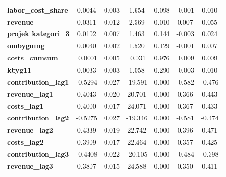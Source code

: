 \begin{center}
\begin{tabular}{lcccccc}
\textbf{labor\_cost\_share}                 &       0.0044  &        0.003     &     1.654  &         0.098        &       -0.001    &        0.010     \\
\textbf{revenue}                            &       0.0311  &        0.012     &     2.569  &         0.010        &        0.007    &        0.055     \\
\textbf{projektkategori\_3}                 &       0.0102  &        0.007     &     1.463  &         0.144        &       -0.003    &        0.024     \\
\textbf{ombygning}                          &       0.0030  &        0.002     &     1.520  &         0.129        &       -0.001    &        0.007     \\
\textbf{costs\_cumsum}                      &      -0.0001  &        0.005     &    -0.031  &         0.976        &       -0.009    &        0.009     \\
\textbf{kbyg11}                             &       0.0033  &        0.003     &     1.058  &         0.290        &       -0.003    &        0.010     \\
\textbf{contribution\_lag1}                 &      -0.5294  &        0.027     &   -19.591  &         0.000        &       -0.582    &       -0.476     \\
\textbf{revenue\_lag1}                      &       0.4043  &        0.020     &    20.701  &         0.000        &        0.366    &        0.443     \\
\textbf{costs\_lag1}                        &       0.4000  &        0.017     &    24.071  &         0.000        &        0.367    &        0.433     \\
\textbf{contribution\_lag2}                 &      -0.5275  &        0.027     &   -19.346  &         0.000        &       -0.581    &       -0.474     \\
\textbf{revenue\_lag2}                      &       0.4339  &        0.019     &    22.742  &         0.000        &        0.396    &        0.471     \\
\textbf{costs\_lag2}                        &       0.3909  &        0.017     &    22.464  &         0.000        &        0.357    &        0.425     \\
\textbf{contribution\_lag3}                 &      -0.4408  &        0.022     &   -20.105  &         0.000        &       -0.484    &       -0.398     \\
\textbf{revenue\_lag3}                      &       0.3807  &        0.015     &    24.588  &         0.000        &        0.350    &        0.411     \\

\end{tabular}
\end{center}
